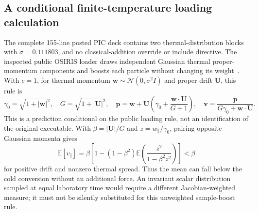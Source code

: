 \subsection{A conditional finite-temperature loading calculation}
The complete 155-line posted PIC deck contains two thermal-distribution
blocks with $\sigma=0.111803$, and no classical-addition override or include
directive. The inspected public OSIRIS loader draws independent Gaussian
thermal proper-momentum components and boosts each particle without changing
its weight~\cite{osirisloader}. With $c=1$, for thermal momentum
$\mathbf w\sim\mathcal N(0,\sigma^2I)$ and proper drift $\mathbf U$, this rule is
\[
 \gamma_0=\sqrt{1+|\mathbf w|^2},\quad G=\sqrt{1+|\mathbf U|^2},\quad
 \mathbf p=\mathbf w+\mathbf U
 \left(\gamma_0+\frac{\mathbf w\cdot\mathbf U}{G+1}\right),\quad
 \mathbf v=\frac{\mathbf p}{G\gamma_0+\mathbf w\cdot\mathbf U}.
\]
This is a prediction conditional on the public loading rule, not an
identification of the original executable. With $\beta=|\mathbf U|/G$ and
$z=w_\parallel/\gamma_0$, pairing opposite Gaussian momenta gives
\[
 \mathbb E[v_\parallel]
 =\beta\left[1-(1-\beta^2)
 \mathbb E\left(\frac{z^2}{1-\beta^2z^2}\right)\right]<\beta
\]
for positive drift and nonzero thermal spread. Thus the mean can fall below
the cold conversion without an additional force. An invariant scalar
distribution sampled at equal laboratory time would require a different
Jacobian-weighted measure; it must not be silently substituted for this
unweighted sample-boost rule.

